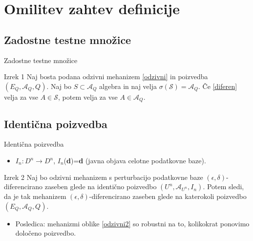 \documentclass{beamer}
\begin{document}
\section{Omilitev zahtev definicije}

\subsection{Zadostne testne množice}
\begin{frame}{Zadostne testne množice}
\begin{block}{Izrek 1}
Naj bosta podana odzivni mehanizem \eqref{odzivni} in poizvedba $(E_Q, \mathcal{A}_Q, Q)$. Naj bo $S \subset \mathcal{A}_Q$ algebra in naj velja $\sigma(\mathcal{S}) = \mathcal{A}_Q$. Če \eqref{diferen} velja za vse $A \in \mathcal{S}$, potem velja za vse $A \in \mathcal{A}_Q$. 
\end{block}
\end{frame}

\subsection{Identična poizvedba}
\begin{frame}{Identična poizvedba}
\begin{itemize}
\item $I_n : D^n \rightarrow D^n$, $I_n$(\textbf{d})=\textbf{d} (javna objava celotne podatkovne baze).
\end{itemize}
\begin{block}{Izrek 2}
Naj bo odzivni mehanizem s perturbacijo podatkovne baze  $(\epsilon , \delta)$-diferencirano zaseben glede na identično poizvedbo $(U^n, \mathcal{A}_{U^n}, I_n)$. Potem sledi, da je tak mehanizem $(\epsilon , \delta)$-diferencirano zaseben glede na katerokoli poizvedbo $(E_Q, \mathcal{A}_Q, Q)$.
\end{block}
\begin{itemize}
\item  Posledica: mehanizmi oblike \eqref{odzivni2} so robustni na to, kolikokrat ponovimo določeno poizvedbo.
\end{itemize}
\end{frame}
\end{document}
